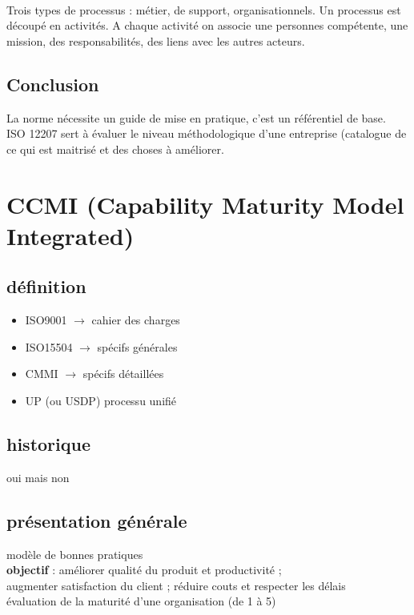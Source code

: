\hfill\\

Trois types de processus : métier, de support, organisationnels.
Un processus est découpé en activités. A chaque activité on associe une personnes compétente, une mission, des responsabilités, des liens avec les autres acteurs.

	\subsection{Conclusion}

La norme nécessite un guide de mise en pratique, c’est un référentiel de base.\\
ISO 12207 sert à évaluer le niveau méthodologique d’une entreprise (catalogue de ce qui est maitrisé et des choses à améliorer.

\section{CCMI (Capability Maturity Model Integrated)}

	\subsection{définition}

\begin{itemize}
\item ISO9001 $\rightarrow$ cahier des charges
\item ISO15504 $\rightarrow$ spécifs générales
\item CMMI $\rightarrow$ spécifs détaillées
\item UP (ou USDP) processu unifié
\end{itemize}

	\subsection{historique}

oui mais non

	\subsection{présentation générale}

modèle de bonnes pratiques\\
\textbf{objectif} : améliorer qualité du produit et productivité ;\\ augmenter satisfaction du client ; réduire couts et respecter les délais\\
évaluation de la maturité d’une organisation (de 1 à 5)

